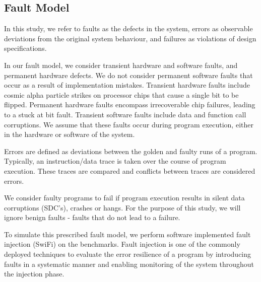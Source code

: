 \subsection{Fault Model}
\label{sec:fault_model}

In this study, we refer to faults as the defects in the system, errors as observable deviations from the original system behaviour, and failures as violations of design specifications.

In our fault model, we consider transient hardware and software faults, and permanent hardware defects.
We do not consider permanent software faults that occur as a result of implementation mistakes.
Transient hardware faults include cosmic alpha particle strikes on processor chips that cause a single bit to be flipped.
Permanent hardware faults encompass irrecoverable chip failures, leading to a stuck at bit fault.
Transient software faults include data and function call corruptions. 
We assume that these faults occur during program execution, either in the hardware or software of the system. 

Errors are defined as deviations between the golden and faulty runs of a program.
Typically, an instruction/data trace is taken over the course of program execution. 
These traces are compared and conflicts between traces are considered errors.

We consider faulty programs to fail if program execution results in silent data corruptions (SDC's), crashes or hangs. For the purpose of this study, we will ignore benign faults - faults that do not lead to a failure.

To simulate this prescribed fault model, we perform software implemented fault injection (SwiFi) on the benchmarks.  
Fault injection is one of the commonly deployed techniques to evaluate the error resilience of a program by introducing faults in a systematic manner and enabling monitoring of the system throughout the injection phase.
